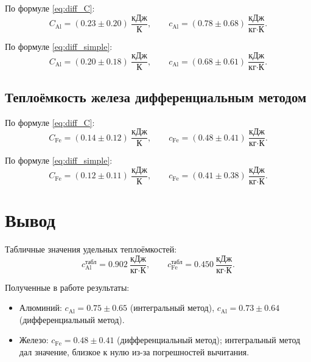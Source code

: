 \documentclass[a4paper,12pt]{article}
\begin{document}
По формуле \eqref{eq:diff_C}:
\begin{equation}
    C_{\text{Al}} = (0.23 \pm 0.20) \ \frac{\text{кДж}}{\text{К}}, \qquad
    c_{\text{Al}} = (0.78 \pm 0.68) \ \frac{\text{кДж}}{\text{кг} \cdot \text{К}}.
\end{equation}

По формуле \eqref{eq:diff_simple}:
\begin{equation}
    C_{\text{Al}} = (0.20 \pm 0.18) \ \frac{\text{кДж}}{\text{К}}, \qquad
    c_{\text{Al}} = (0.68 \pm 0.61) \ \frac{\text{кДж}}{\text{кг} \cdot \text{К}}.
\end{equation}

\subsection{Теплоёмкость железа дифференциальным методом}

По формуле \eqref{eq:diff_C}:
\begin{equation}
    C_{\text{Fe}} = (0.14 \pm 0.12) \ \frac{\text{кДж}}{\text{К}}, \qquad
    c_{\text{Fe}} = (0.48 \pm 0.41) \ \frac{\text{кДж}}{\text{кг} \cdot \text{К}}.
\end{equation}

По формуле \eqref{eq:diff_simple}:
\begin{equation}
    C_{\text{Fe}} = (0.12 \pm 0.11) \ \frac{\text{кДж}}{\text{К}}, \qquad
    c_{\text{Fe}} = (0.41 \pm 0.38) \ \frac{\text{кДж}}{\text{кг} \cdot \text{К}}.
\end{equation}

\section{Вывод}
Табличные значения удельных теплоёмкостей:
\begin{equation}
    c_{\text{Al}}^{\text{табл}} = 0.902 \ \frac{\text{кДж}}{\text{кг} \cdot \text{К}}, \qquad
    c_{\text{Fe}}^{\text{табл}} = 0.450 \ \frac{\text{кДж}}{\text{кг} \cdot \text{К}}.
\end{equation}

Полученные в работе результаты:
\begin{itemize}
    \item Алюминий: $c_{\text{Al}} = 0.75 \pm 0.65$ (интегральный метод), $c_{\text{Al}} = 0.73 \pm 0.64$ (дифференциальный метод).
    \item Железо: $c_{\text{Fe}} = 0.48 \pm 0.41$ (дифференциальный метод); интегральный метод дал значение, близкое к нулю из-за погрешностей вычитания.
\end{itemize}
\end{document}

